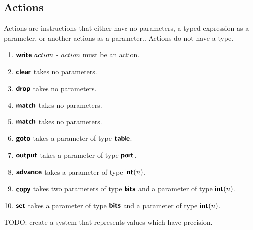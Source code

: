 \subsection*{Actions}

Actions are instructions that either have no parameters, a typed expression as a parameter, or another actions as a parameter.. Actions do not have a type.
\begin{enumerate}
  \item $\bm{\mathsf{{write}}} \ action$ - $action$ must be an action.
  \item $\bm{\mathsf{{clear}}}$ takes no parameters.
  \item $\bm{\mathsf{{drop}}}$ takes no parameters.
  \item $\bm{\mathsf{{match}}}$ takes no parameters.
  \item $\bm{\mathsf{{match}}}$ takes no parameters.
  \item $\bm{\mathsf{{goto}}}$ takes a parameter of type $\bm{\mathsf{{table}}}$.
  \item $\bm{\mathsf{{output}}}$ takes a parameter of type $\bm{\mathsf{{port}}}$.
  \item $\bm{\mathsf{{advance}}}$ takes a parameter of type $\bm{\mathsf{{int}}}(n)$.
  \item $\bm{\mathsf{{copy}}}$ takes two parameters of type $\bm{\mathsf{{bits}}}$ and a parameter of type $\bm{\mathsf{{int}}}(n)$.
  \item $\bm{\mathsf{{set}}}$ takes a parameter of type $\bm{\mathsf{{bits}}}$ and a parameter of type $\bm{\mathsf{{int}}}(n)$.
\end{enumerate}

TODO: create a system that represents values which have precision.
